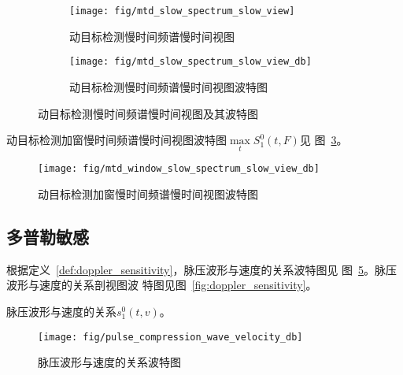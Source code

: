 \documentclass[../main]{subfiles}
\begin{document}
\begin{figure}[htbp]
  \centering
  \begin{subfigure}[htbp]{0.45\linewidth}
    \centering
    \texttt{[image: fig/mtd\_slow\_spectrum\_slow\_view]}
    \caption{动目标检测慢时间频谱慢时间视图}%
    \label{fig:mtd_slow_spectrum_slow_view}
  \end{subfigure}
  \quad
  \begin{subfigure}[htbp]{0.45\linewidth}
    \centering
    \texttt{[image: fig/mtd\_slow\_spectrum\_slow\_view\_db]}
    \caption{动目标检测慢时间频谱慢时间视图波特图}%
    \label{fig:mtd_slow_spectrum_slow_view_db}
  \end{subfigure}
  \caption{动目标检测慢时间频谱慢时间视图及其波特图}%
  \label{fig:mtd_slow_spectrum_slow_view_and_db}
\end{figure}

动目标检测加窗慢时间频谱慢时间视图波特图$\max\limits_{t}S_1^0(t, F)$见
图~\ref{fig:mtd_slow_spectrum_slow_view_and_db}。

\begin{figure}[htbp]
  \centering
  \texttt{[image: fig/mtd\_window\_slow\_spectrum\_slow\_view\_db]}
  \caption{动目标检测加窗慢时间频谱慢时间视图波特图}%
  \label{fig:mtd_window_slow_spectrum_slow_view_db}
\end{figure}

\subsection{多普勒敏感}%
\label{sub:doppler_sensitivity}

根据定义~\ref{def:doppler_sensitivity}，脉压波形与速度的关系波特图见
图~\ref{fig:pulse_compression_wave_velocity_db}。脉压波形与速度的关系剖视图波
特图见图~\ref{fig:doppler_sensitivity}。

\begin{definition}[多普勒敏感]%
  \label{def:doppler_sensitivity}
  脉压波形与速度的关系$s_1^0(t, v)$。
\end{definition}

\begin{figure}[htbp]
  \centering
  \texttt{[image: fig/pulse\_compression\_wave\_velocity\_db]}
  \caption{脉压波形与速度的关系波特图}%
  \label{fig:pulse_compression_wave_velocity_db}
\end{figure}
\end{document}
